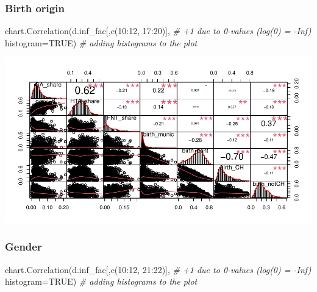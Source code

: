 \documentclass[
]{article}
\newenvironment{Shaded}{\begin{snugshade}}{\end{snugshade}}
\newcommand{\AttributeTok}[1]{\textcolor[rgb]{0.77,0.63,0.00}{#1}}
\newcommand{\CommentTok}[1]{\textcolor[rgb]{0.56,0.35,0.01}{\textit{#1}}}
\newcommand{\ConstantTok}[1]{\textcolor[rgb]{0.00,0.00,0.00}{#1}}
\newcommand{\DecValTok}[1]{\textcolor[rgb]{0.00,0.00,0.81}{#1}}
\newcommand{\FunctionTok}[1]{\textcolor[rgb]{0.00,0.00,0.00}{#1}}
\newcommand{\NormalTok}[1]{#1}
\newcommand{\SpecialCharTok}[1]{\textcolor[rgb]{0.00,0.00,0.00}{#1}}
\begin{document}
\hypertarget{birth-origin}{%
\subsubsection{Birth origin}\label{birth-origin}}

\begin{Shaded}
\begin{Highlighting}[]
\FunctionTok{chart.Correlation}\NormalTok{(d.inf\_fac[,}\FunctionTok{c}\NormalTok{(}\DecValTok{10}\SpecialCharTok{:}\DecValTok{12}\NormalTok{, }\DecValTok{17}\SpecialCharTok{:}\DecValTok{20}\NormalTok{)], }\CommentTok{\# +1 due to 0{-}values (log(0) = {-}Inf)}
                  \AttributeTok{histogram=}\ConstantTok{TRUE}\NormalTok{) }\CommentTok{\# adding histograms to the plot}
\end{Highlighting}
\end{Shaded}

\includegraphics{Lin_Mod_Clus_Analysis_files/figure-latex/unnamed-chunk-8-1.pdf}

\hypertarget{gender}{%
\subsubsection{Gender}\label{gender}}

\begin{Shaded}
\begin{Highlighting}[]
\FunctionTok{chart.Correlation}\NormalTok{(d.inf\_fac[,}\FunctionTok{c}\NormalTok{(}\DecValTok{10}\SpecialCharTok{:}\DecValTok{12}\NormalTok{, }\DecValTok{21}\SpecialCharTok{:}\DecValTok{22}\NormalTok{)], }\CommentTok{\# +1 due to 0{-}values (log(0) = {-}Inf)}
                  \AttributeTok{histogram=}\ConstantTok{TRUE}\NormalTok{) }\CommentTok{\# adding histograms to the plot}
\end{Highlighting}
\end{Shaded}
\end{document}
